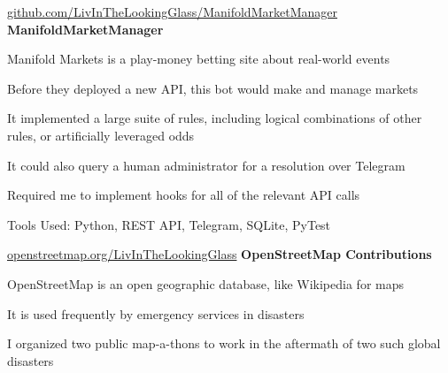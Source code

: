 	\vspace{0.2 cm}

	\begin{samepage}
		\begin{twocolentry}
			{\hspace{-7 cm} \href{https://github.com/LivInTheLookingGlass/ManifoldMarketManager}{\mbox{github.com/LivInTheLookingGlass/ManifoldMarketManager}} } \textbf{ManifoldMarketManager}
		\end{twocolentry}
	
		\begin{onecolentry}
			\begin{highlights}
				\item Manifold Markets is a play-money betting site about real-world events
				\item Before they deployed a new API, this bot would make and manage markets
				\item It implemented a large suite of rules, including logical combinations of other rules, or artificially leveraged odds
				\item It could also query a human administrator for a resolution over Telegram
				\item Required me to implement hooks for all of the relevant API calls
				\item Tools Used: Python, REST API, Telegram, SQLite, PyTest
			\end{highlights}
		\end{onecolentry}
	\end{samepage}

	\vspace{0.2 cm}

	\begin{samepage}
		\begin{twocolentry}
			{\hspace{-3 cm} \href{https://openstreetmap.org/LivInTheLookingGlass}{\mbox{openstreetmap.org/LivInTheLookingGlass}} } \textbf{OpenStreetMap Contributions}
		\end{twocolentry}
	
		\begin{onecolentry}
			\begin{highlights}
				\item OpenStreetMap is an open geographic database, like Wikipedia for maps
				\item It is used frequently by emergency services in disasters
				\item I organized two public map-a-thons to work in the aftermath of two such global disasters
			\end{highlights}
		\end{onecolentry}
	\end{samepage}

